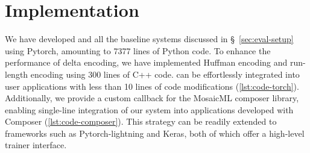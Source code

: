 \section{Implementation}



We have developed \sys and all the baseline systems discussed in \S~\ref{sec:eval-setup} using Pytorch, amounting to 7377 lines of Python code. To enhance the performance of delta encoding, we have implemented Huffman encoding and run-length encoding using 300 lines of C++ code. \sys can be effortlessly integrated into user applications with less than 10 lines of code modifications (\cref{lst:code-torch}). Additionally, we provide a custom callback for the MosaicML composer library, enabling single-line integration of our system into applications developed with Composer (\cref{lst:code-composer}). This strategy can be readily extended to frameworks such as Pytorch-lightning and Keras, both of which offer a high-level trainer interface.



